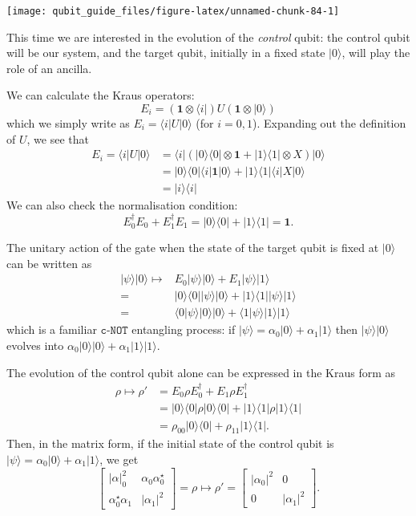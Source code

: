 \documentclass[fleqn,a4paper]{article}
\theoremstyle{definition}
\theoremstyle{definition}
\theoremstyle{definition}
\theoremstyle{definition}
\theoremstyle{remark}
\begin{document}
\begin{center}\texttt{[image: qubit\_guide\_files/figure-latex/unnamed-chunk-84-1]} \end{center}

This time we are interested in the evolution of the \emph{control} qubit: the control qubit will be our system, and the target qubit, initially in a fixed state \(|0\rangle\), will play the role of an ancilla.

We can calculate the Kraus operators:
\[
  E_i = (\mathbf{1}\otimes\langle i|) U (\mathbf{1}\otimes|0\rangle)
\]
which we simply write as \(E_i=\langle i|U|0\rangle\) (for \(i=0,1\)).
Expanding out the definition of \(U\), we see that
\[
  \begin{aligned}
    E_i = \langle i|U|0\rangle
    &= \langle i| (|0\rangle\langle 0|\otimes\mathbf{1}+ |1\rangle\langle 1|\otimes X) |0\rangle
  \\&= |0\rangle\langle 0|\langle i|\mathbf{1}|0\rangle + |1\rangle\langle 1|\langle i|X|0\rangle
  \\&= |i\rangle\langle i|
\end{aligned}
\]
We can also check the normalisation condition:
\[
  E_0^\dagger E_0 + E_1^\dagger E_1
  = |0\rangle\langle 0| + |1\rangle\langle 1|
  =\mathbf{1}.
\]

The unitary action of the gate when the state of the target qubit is fixed at \(|0\rangle\) can be written as
\[
  \begin{aligned}
    |\psi\rangle|0\rangle
    \longmapsto
    & E_0|\psi\rangle|0\rangle + E_1|\psi\rangle|1\rangle
  \\=& |0\rangle\langle 0||\psi\rangle|0\rangle + |1\rangle\langle 1||\psi\rangle|1\rangle
  \\=& \langle 0|\psi\rangle|0\rangle|0\rangle + \langle 1|\psi\rangle|1\rangle|1\rangle
  \end{aligned}
\]
which is a familiar \(\texttt{c-NOT}\) entangling process: if \(|\psi\rangle=\alpha_0|0\rangle+\alpha_1|1\rangle\) then \(|\psi\rangle|0\rangle\) evolves into \(\alpha_0|0\rangle|0\rangle+\alpha_1|1\rangle|1\rangle\).

The evolution of the control qubit alone can be expressed in the Kraus form as
\[
  \begin{aligned}
    \rho \longmapsto \rho'
    &= E_0\rho E_0^\dagger + E_1\rho E_1^\dagger
  \\&= |0\rangle\langle 0|\rho|0\rangle\langle 0| + |1\rangle\langle 1|\rho|1\rangle\langle 1|
  \\&= \rho_{00}|0\rangle\langle 0| + \rho_{11}|1\rangle\langle 1|.
  \end{aligned}
\]
Then, in the matrix form, if the initial state of the control qubit is \(|\psi\rangle=\alpha_0|0\rangle+\alpha_1|1\rangle\), we get
\[
  \begin{bmatrix}
    |\alpha|_0^2 & \alpha_0\alpha_0^\star
  \\\alpha_0^\star\alpha_1 & |\alpha_1|^2
  \end{bmatrix}
  = \rho
  \longmapsto
  \rho' =
  \begin{bmatrix}
    |\alpha_0|^2 & 0
  \\0 & |\alpha_1|^2
  \end{bmatrix}.
\]
\end{document}

